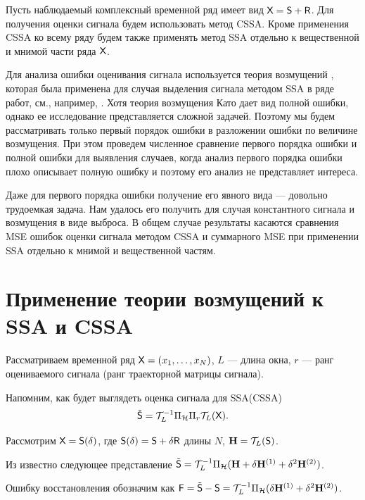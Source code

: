 \documentclass[specialist,
               substylefile = spbu.rtx,
               subf,href,colorlinks=true, 12pt]{disser}
\begin{document}
Пусть наблюдаемый комплексный временной ряд имеет вид $\textsf{X} =\textsf{S} + \textsf{R}$. Для получения оценки сигнала будем использовать метод CSSA. Кроме применения CSSA ко всему ряду будем также применять метод SSA отдельно к вещественной и мнимой части ряда $\textsf{X}$.

Для анализа ошибки оценивания сигнала используется теория возмущений \cite{Kato}, которая была применена для случая выделения сигнала методом SSA в ряде работ, см., например, \cite{Nekrutkin}.
Хотя теория возмущения Като дает вид полной ошибки, однако ее исследование представляется сложной задачей. Поэтому мы будем рассматривать только первый порядок ошибки в разложении ошибки по величине возмущения.
При этом проведем численное сравнение первого порядка ошибки и полной ошибки для выявления случаев, когда анализ первого порядка ошибки плохо описывает полную ошибку и поэтому его анализ не представляет интереса.

Даже для первого порядка ошибки получение его явного вида --- довольно трудоемкая задача. Нам удалось его получить для случая константного сигнала и возмущения в виде выброса. В общем случае результаты касаются сравнения MSE ошибок оценки сигнала методом CSSA и суммарного MSE при применении SSA отдельно к мнимой и вещественной частям.


\section{Применение теории возмущений к SSA и CSSA}

Рассматриваем временной ряд $\textsf{X}=(x_1, \ldots, x_{N})$, $L$ --- длина окна, $r$ --- ранг оцениваемого сигнала (ранг траекторной матрицы сигнала).

Напомним, как будет выглядеть оценка сигнала для SSA(CSSA)
	\begin{equation*}
		\tilde{\textsf{S}} = \mathcal{T}^{-1}_{L} \Pi_{\mathcal{H}} \Pi_{r} \mathcal{T}_L (\textsf{X}).
	\end{equation*}

Рассмотрим $\textsf{X} = \textsf{S}(\delta)$, где $\textsf{S}(\delta) = \textsf{S} + \delta \textsf{R}$ длины $N$, $\mathbf{H} = \mathcal{T}_L(\textsf{S})$.

Из \cite{Nekr2008} известно следующее представление $\tilde{\textsf{S}} = \mathcal{T}_L^{-1} \Pi_{\mathcal{H}} (\mathbf{H} + \delta\mathbf{H}^{(1)} + \delta^2\mathbf{H}^{(2)})$.

Ошибку восстановления обозначим как $\textsf{F} = \tilde{\textsf{S}} - \textsf{S} = \mathcal{T}_L^{-1} \Pi_{\mathcal{H}} (\delta\mathbf{H}^{(1)} + \delta^2\mathbf{H}^{(2)})$.
\end{document}
